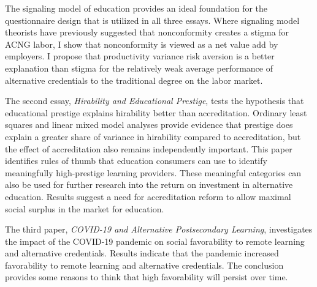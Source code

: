 \documentclass[11 pt]{report}
\begin{document}
\abstractmultiplepage

The signaling model of education provides an ideal foundation for the questionnaire design that is utilized in all three essays. Where signaling model theorists have previously suggested that nonconformity creates a stigma for ACNG labor, I show that nonconformity is viewed as a net value add by employers. I propose that productivity variance risk aversion is a better explanation than stigma for the relatively weak average performance of alternative credentials to the traditional degree on the labor market.

The second essay,
\textit{Hirability and Educational Prestige},
tests the hypothesis that educational prestige explains hirability better than accreditation. Ordinary least squares and linear mixed model analyses provide evidence that prestige does explain a greater share of variance in hirability compared to accreditation, but the effect of accreditation also remains independently important. This paper identifies rules of thumb that education consumers can use to identify meaningfully high-prestige learning providers. These meaningful categories can also be used for further research into the return on investment in alternative education. Results suggest a need for accreditation reform to allow maximal social surplus in the market for education.

The third paper,
\textit{COVID-19 and Alternative Postsecondary Learning},
investigates the impact of the COVID-19 pandemic on social favorability to remote learning and alternative credentials. Results indicate that the pandemic increased favorability to remote learning and alternative credentials. The conclusion provides some reasons to think that high favorability will persist over time.

\startofchapters







\end{document}

